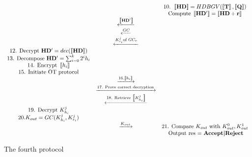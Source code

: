 \begin{figure}[h!]
\begin{equation*}
\begin{array}{c c c}
                               & & \text{10. } \left\llbracket\mathbf{HD}\right\rrbracket = HDBGV(\left\llbracket\mathbf{T}\right\rrbracket,\left\llbracket\mathbf{Q}\right\rrbracket) \\
          
                                   & & \text{Compute } \left\llbracket\mathbf{HD'}\right\rrbracket = \left\llbracket\mathbf{HD + r}\right\rrbracket\\

                               & \xleftarrow{\left\llbracket\mathbf{HD'}\right\rrbracket} & \\

                               & \xleftarrow{GC} & \\

                               & \xleftarrow{K_{r_i}^j \text{of } GC_r} & \\

          \text{12. Decrypt } \mathbf{HD'} = dec(\left\llbracket\mathbf{HD}\right\rrbracket) & & \\

          \text{13. Decompose } \mathbf{HD'} = \sum_{i=0}^k{2^ih_i} & & \\

          \text{14. Encrypt } \left\llbracket h_i\right\rrbracket & & \\
          
          \text{15. Initiate OT protocol} & & \\

                               & \xrightarrow{16. \left\llbracket h_i\right\rrbracket} & \\
          
                               & \xrightarrow{\text{17. Prove correct decryption}} & \\

                               & \xleftarrow{\text{18. Retrieve } \left\llbracket K_{h_i}^j\right\rrbracket} & \\

          \text{19. Decrypt } K_{h_i}^j & & \\
          20. K_{out} = GC( K_{h_i}^j , K_{r_i}^j) & & \\

                               & \xrightarrow{K_{out}} & \text{21. Compare } K_{out} \text{ with } K_{out}^0, K_{out}^1 \\
          & & \text{ Output res = \textbf{Accept|Reject}}
        \end{array}
    \end{equation*}

  \caption{The fourth protocol}
  \label{fig:fourthProtocol}
\end{figure}

